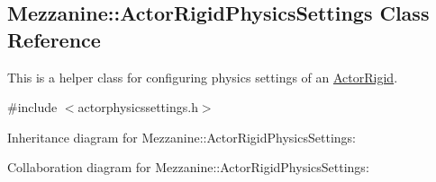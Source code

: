 \hypertarget{classMezzanine_1_1ActorRigidPhysicsSettings}{\subsection{Mezzanine\-:\-:Actor\-Rigid\-Physics\-Settings Class Reference}
\label{classMezzanine_1_1ActorRigidPhysicsSettings}
}


This is a helper class for configuring physics settings of an \hyperlink{classMezzanine_1_1ActorRigid}{Actor\-Rigid}.  




{\ttfamily \#include $<$actorphysicssettings.\-h$>$}



Inheritance diagram for Mezzanine\-:\-:Actor\-Rigid\-Physics\-Settings\-:


Collaboration diagram for Mezzanine\-:\-:Actor\-Rigid\-Physics\-Settings\-:
